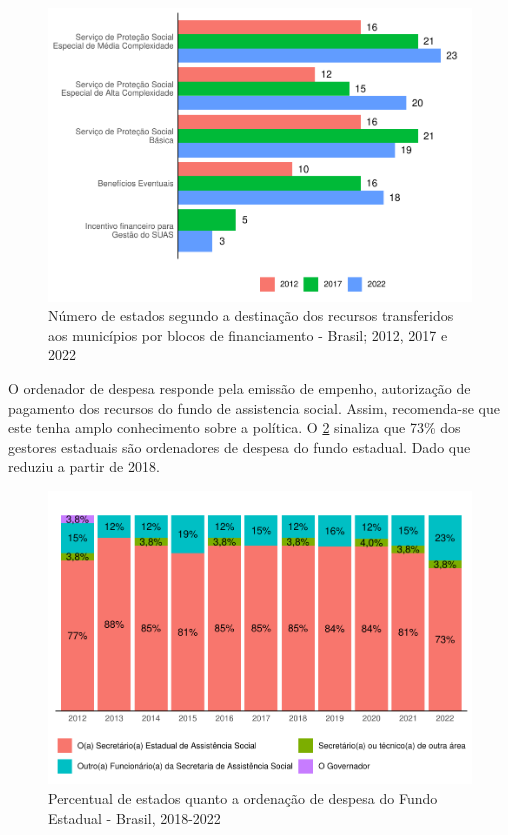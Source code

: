 \documentclass[
  brazilian]{report}
\begin{document}
\begin{figure}
\includegraphics{Censo-SUAS-2022_files/figure-latex/estados-blocos-recursos-1} \caption[Número de estados segundo a destinação dos recursos transferidos aos municípios por blocos de financiamento - Brasil]{Número de estados segundo a destinação dos recursos transferidos aos municípios por blocos de financiamento - Brasil; 2012, 2017 e 2022}\label{fig:estados-blocos-recursos}
\end{figure}

O ordenador de despesa responde pela emissão de empenho, autorização de
pagamento dos recursos do fundo de assistencia social. Assim,
recomenda-se que este tenha amplo conhecimento sobre a política. O
\cref{fig:estado_ord_despesa} sinaliza que 73\% dos gestores estaduais
são ordenadores de despesa do fundo estadual. Dado que reduziu a partir
de 2018.

\begin{figure}
\includegraphics{Censo-SUAS-2022_files/figure-latex/estado_ord_despesa-1} \caption[Percentual de estados quanto a ordenação de despesa do Fundo Estadual - Brasil, 2018-2022]{Percentual de estados quanto a ordenação de despesa do Fundo Estadual - Brasil, 2018-2022}\label{fig:estado_ord_despesa}
\end{figure}
\end{document}
